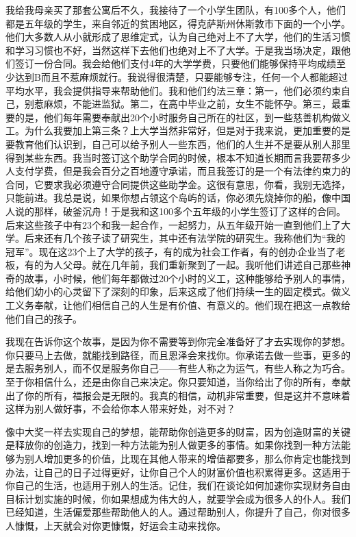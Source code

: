 我给我母亲买了那套公寓后不久，我接待了一个小学生团队，有100多个人，他们都是五年级的学生，来自邻近的贫困地区，得克萨斯州休斯敦市下面的一个小学。他们大多数人从小就形成了思维定式，认为自己绝对上不了大学，他们的生活习惯和学习习惯也不好，当然这样下去他们也绝对上不了大学。于是我当场决定，跟他们签订一份合同。我会给他们支付4年的大学学费，只要他们能够保持平均成绩至少达到B而且不惹麻烦就行。我说得很清楚，只要能够专注，任何一个人都能超过平均水平，我会提供指导来帮助他们。我和他们约法三章：第一，他们必须约束自己，别惹麻烦，不能进监狱。第二，在高中毕业之前，女生不能怀孕。第三，最重要的是，他们每年需要奉献出20个小时服务自己所在的社区，到一些慈善机构做义工。为什么我要加上第三条？上大学当然非常好，但是对于我来说，更加重要的是要教育他们认识到，自己可以给予别人一些东西，他们的人生并不是要从别人那里得到某些东西。我当时签订这个助学合同的时候，根本不知道长期而言我要帮多少人支付学费，但是我会百分之百地遵守承诺，而且我签订的是一个有法律约束力的合同，它要求我必须遵守合同提供这些助学金。这很有意思，你看，我别无选择，只能前进。我总是说，如果你想占领这个岛屿的话，你必须先烧掉你的船，像中国人说的那样，破釜沉舟！于是我和这100多个五年级的小学生签订了这样的合同。后来这些孩子中有23个和我一起合作，一起努力，从五年级开始一直到他们上了大学。后来还有几个孩子读了研究生，其中还有法学院的研究生。我称他们为“我的冠军”。现在这23个上了大学的孩子，有的成为社会工作者，有的创办企业当了老板，有的为人父母。就在几年前，我们重新聚到了一起。我听他们讲述自己那些神奇的故事，小时候，他们每年都做过20个小时的义工，这种能够给予别人的事情，给他们幼小的心灵留下了深刻的印象，后来这成了他们持续一生的固定模式。做义工义务奉献，让他们相信自己的人生是有价值、有意义的。他们现在把这一点教给他们自己的孩子。

我现在告诉你这个故事，是因为你不需要等到你完全准备好了才去实现你的梦想。你只要马上去做，就能找到路径，而且恩泽会来找你。你承诺去做一些事，更多的是去服务别人，而不仅是服务你自己——有些人称之为运气，有些人称之为巧合。至于你相信什么，还是由你自己来决定。你只要知道，当你给出了你的所有，奉献出了你的所有，福报会是无限的。我真的相信，动机非常重要，但是这并不意味着这样为别人做好事，不会给你本人带来好处，对不对？

像中大奖一样去实现自己的梦想，能帮助你创造更多的财富，因为创造财富的关键是释放你的创造力，找到一种方法能为别人做更多的事情。如果你找到一种方法能够为别人增加更多的价值，比现在其他人带来的增值都要多，那么你肯定也能找到办法，让自己的日子过得更好，让你自己个人的财富价值也积累得更多。这适用于你自己的生活，也适用于别人的生活。记住，我们在谈论如何加速你实现财务自由目标计划实施的时候，你如果想成为伟大的人，就要学会成为很多人的仆人。我们已经知道，生活偏爱那些帮助他人的人。通过帮助别人，你提升了自己，你对很多人慷慨，上天就会对你更慷慨，好运会主动来找你。

